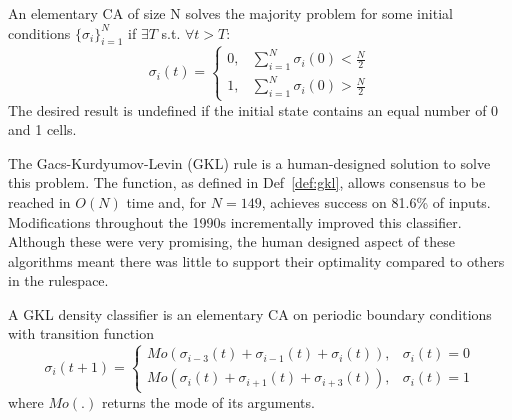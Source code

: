 \begin{definition}\label{def:majority-problem}
An elementary CA of size N solves the majority problem for some initial conditions $\{\sigma_i\}_{i=1}^{N}$ if $\exists T$ s.t. $\forall t > T$:
\[
    \sigma_i(t) = 
    \begin{cases}
    0, & \sum_{i=1}^{N}\sigma_i(0) < \frac{N}{2} \\
    1, & \sum_{i=1}^{N}\sigma_i(0) > \frac{N}{2}
    \end{cases}
\]
The desired result is undefined if the initial state contains an equal number of 0 and 1 cells.
\end{definition}

The Gacs-Kurdyumov-Levin (GKL) rule is a human-designed solution to solve this problem. The function, as defined in Def~\ref{def:gkl}, allows consensus to be reached in $O(N)$ time and, for $N=149$, achieves success on 81.6\% of inputs\cite{gacs1978one}. Modifications throughout the 1990s incrementally improved this classifier\cite{das1995evolving}. Although these were very promising, the human designed aspect of these algorithms meant there was little to support their optimality compared to others in the rulespace.

\begin{definition} \label{def:gkl}
A GKL density classifier is an elementary CA on periodic boundary conditions with transition function
\[
   \sigma_i(t+1) =
    \begin{cases}
    Mo(\sigma_{i-3}(t) + \sigma_{i-1}(t) + \sigma_i(t)), & \sigma_i(t) = 0 \\
    Mo(\sigma_i(t) + \sigma_{i+1}(t) + \sigma_{i+3}(t)), & \sigma_i(t) = 1
    \end{cases}
\]
where $Mo(.)$ returns the mode of its arguments.
\end{definition}

